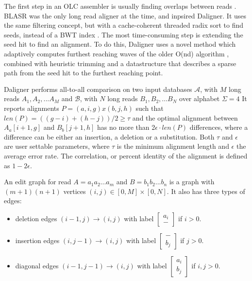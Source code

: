 \documentclass[../main/thesis.tex]{subfiles}
\begin{document}
The first step in an \ac{OLC} assembler is usually finding overlaps between reads \cite{OLC}.
BLASR \cite{BLASR} was the only long read aligner at the time, and inpsired Daligner.
It uses the same filtering concept, but with a cache-coherent threaded radix sort to find seeds, instead of a BWT index \cite{BWT}.
The most time-consuming step is extending the seed hit to find an alignment.
To do this, Daligner uses a novel method which adaptively computes furthest reaching waves of the older O(nd) algorithm \cite{O_ND}, combined with heuristic trimming and a datastructure that describes a sparse path from the seed hit to the furthest reaching point.

Daligner performs all-to-all comparison on two input databases $\mathcal{A}$, with $M$ long reads $A_1, A_2,...A_M$ and $\mathcal{B}$, with $N$ long reads $B_1, B_2,...B_N$ over alphabet $\Sigma = 4$
It reports alignments $P = (a,i,g)x(b,j,h)$ such that $len(P) = ((g-i)+(h-j))/2 \ge \tau$ and the optimal alignment between $A_a[i+1,g]$ and $B_b[j+1,h]$ has no more than 2$\epsilon \cdot len(P)$ differences, where a difference can be either an insertion, a deletion or a substitution.
Both $\tau$ and $\epsilon$ are user settable parameters, where $\tau$ is the minimum alignment length and $\epsilon$ the average error rate.
The correlation, or percent identity of the alignment is defined as $1-2\epsilon$.

An edit graph for read $A=a_1a_2...a_m$ and $B=b_1b_2...b_n$ is a graph with $(m+1)(n+1)$ vertices $(i,j) \in [0,M]\times[0,N]$.
It also has three types of edges:
\begin{itemize}
\item deletion edges $(i-1,j) \rightarrow (i,j)$ with label
{\small$\begin{bmatrix}
a_i \\ -
\end{bmatrix}$} if $i > 0$.
\item insertion edges $(i,j-1) \rightarrow (i,j)$ with label 
{\small$\begin{bmatrix}
- \\ b_j
\end{bmatrix}$} if $j > 0$.
\item diagonal edges $(i-1,j-1) \rightarrow (i,j)$ with label
{\small$\begin{bmatrix}
a_i \\ b_j
\end{bmatrix}$} if $i,j > 0$.
\end{itemize}
\end{document}
